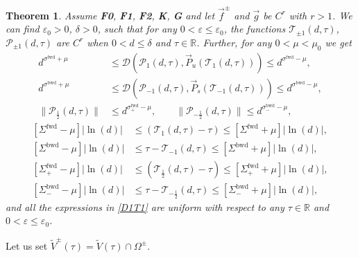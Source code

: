 \documentclass[10pt]{article}
\newtheorem{knowntheorem}{Theorem}
\numberwithin{equation}{section}
\def\sbwd{\sigma^{\textrm{bwd}}}
\def\sfwd{\sigma^{\textrm{fwd}}}
\def\sbwd{\sigma^{\textrm{bwd}}}
\def\sTfwd{\Sigma^{\textrm{fwd}}}
\def\sTbwd{\Sigma^{\textrm{bwd}}}
\def\dist{{\mathscr{D}}}
\def\ep{\varepsilon}
\def\Om{\Omega}
\def\R{{\mathbb R}}
\def\TTT{\mathscr{T}}
\def\PPP{\mathscr{P}}
\def\P{\vec{P}}
\def\f{\vec{f}}
\def\g{\vec{g}}
\newcommand\assump[1]{{\rm\textbf{#1}}}
\theoremstyle{definition}
\theoremstyle{remark}
\begin{document}
 \begin{knowntheorem}\label{key}\cite[Theorem 4.2]{CFPRimut}
Assume \assump{F0}, \assump{F1}, \assump{F2}, \assump{K}, \assump{G}  and    let $\f^\pm$ and $\g$ be $C^r$ with $r>1$.
We can find $\ep_0>0$, $\delta>0$,  such that for any $0<\ep \le \ep_0$,
the functions $\TTT_{\pm 1}(d,\tau)$, $\PPP_{\pm 1}(d,\tau)$ are $C^r$ when
	$0<d \le \delta$ and $\tau \in \R$.
 Further, for any $0< \mu <\mu_0$ we get
	\begin{equation}\label{D1T1}
	\begin{split}
	 	   d^{\sfwd +\mu} & \le \dist (\PPP_1(d,\tau),\P_u(\TTT_1(d,\tau)))
 \le d^{\sfwd-\mu}, \\
	 d^{\sbwd+\mu} & \le \dist (\PPP_{-1}(d,\tau), \P_s (\TTT_{-1}(d,\tau)))
 \le d^{\sbwd-\mu},\\
 \|\PPP_{\frac{1}{2}}(d,\tau)\| & \le d^{\sfwd_+ -\mu}     , \qquad    \|\PPP_{-\frac{1}{2}}(d,\tau)\| \le d^{\sbwd_- -\mu},
	\end{split}
	\end{equation}
	\begin{equation}\label{T1T-1}
	\begin{split}
	 	 \left[\sTfwd -\mu \right] |\ln(d)|& \le  (\TTT_1(d,\tau)-\tau)    \le   \left[\sTfwd+\mu \right] |\ln(d)|, \\
	 \left[\sTbwd -\mu \right] |\ln(d)|
& \le  \tau-\TTT_{-1}(d,\tau)    \le    \left[\sTbwd+\mu \right] |\ln(d)|, \\
 \left[\sTfwd_+ -\mu \right] |\ln(d)|& \le  (\TTT_\frac{1}{2}(d,\tau)-\tau)   \le   \left[\sTfwd_++\mu \right] |\ln(d)|, \\
	 \left[\sTbwd_- - \mu \right] |\ln(d)|
& \le  \tau -\TTT_{-\frac{1}{2}}(d,\tau)     \le    \left[\sTbwd_-+\mu \right] |\ln(d)|,
	\end{split}
	\end{equation}
	and all the expressions in \eqref{D1T1} are uniform with respect to any   $\tau \in \R$ and $0< \ep \le \ep_0$.
\end{knowntheorem}

 Let us set $\tilde{V}^{\pm}(\tau)=\tilde{V}(\tau) \cap \Om^{\pm}$.
\end{document}
